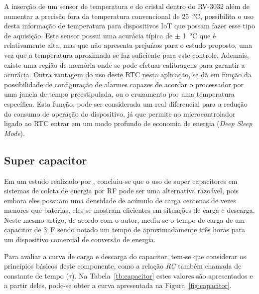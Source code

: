 A inserção de um sensor de temperatura e do cristal dentro do RV-3032 além de aumentar a precisão fora da temperatura convencional de 25~$^o$C, possibilita o uso desta informação de temperatura para dispositivos IoT que possam fazer esse tipo de aquisição.
Este sensor possui uma acurácia típica de $\pm$ 1~$^o$C que é relativamente alta, mas que não apresenta prejuízos para o estudo proposto, uma vez que a temperatura aproximada se faz suficiente para este controle. Ademais, existe uma região de memória onde se pode efetuar calibragens para garantir a acurácia.
Outra vantagem do uso deste RTC nesta aplicação, se dá em função da possibilidade de configuração de alarmes capazes de acordar o processador por uma janela de tempo preestipulada, ou o cruzamento por uma temperatura específica. Esta função, pode ser considerada um real diferencial para a redução do consumo de operação do dispositivo, já que permite ao microcontrolador ligado ao RTC entrar em um modo profundo de economia de energia (\textit{Deep Sleep Mode}).

\subsection{Super capacitor}\label{sec:supercap}
Em um estudo realizado por , concluiu-se que o uso de super capacitores em sistemas de coleta de energia por RF pode ser uma alternativa razoável, pois embora eles possuam uma densidade de acúmulo de carga centenas de vezes menores que baterias, eles se mostram eficientes em situações de carga e descarga. Neste mesmo artigo, de acordo com o autor, mediu-se o tempo de carga de um capacitor de 3~F sendo notado um tempo de aproximadamente três horas para um dispositivo comercial de conversão de energia.

Para avaliar a curva de carga e descarga do capacitor, tem-se que considerar os princípios básicos deste componente, como a relação \textit{RC} também chamada de constante de tempo ($\tau$). Na Tabela~\ref{tb:capacitor} estes valores são apresentados e a partir deles, pode-se obter a curva apresentada na Figura~\ref{fig:capacitor}.


